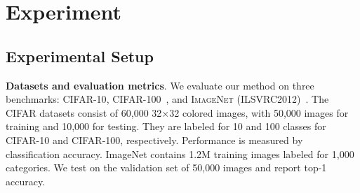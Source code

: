 \documentclass[10pt,twocolumn,letterpaper]{article}
\begin{document}
\section{Experiment}\label{sec:results}\subsection{Experimental Setup}\noindent\textbf{Datasets and evaluation metrics}. We evaluate our method on three benchmarks: \textsc{CIFAR-10}, \textsc{CIFAR-100}~\cite{krizhevsky2009learning}, and \textsc{ImageNet (ILSVRC2012)}~\cite{deng2009imagenet}. The CIFAR datasets consist of 60,000 32$\times$32 colored images, with 50,000 images for training and 10,000 for testing. They are labeled for 10 and 100 classes for CIFAR-10 and CIFAR-100, respectively.  Performance is measured by classification accuracy. ImageNet contains 1.2M training images labeled for 1,000 categories. We test on the validation set of 50,000 images and report top-1 accuracy.
\end{document}
